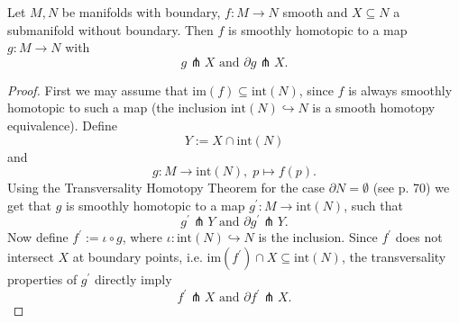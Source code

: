     \begin{theorem}
        \label{thm:transversality_homotopy}
        Let $M,N$ be manifolds with boundary, $f \colon M \to N$ smooth and $X \subseteq N$ a submanifold without boundary. Then $f$ is smoothly homotopic to a map $g \colon M \to N$ with
        \[
            g \pitchfork X \text{ and } \partial g \pitchfork X.
        \]
    \end{theorem}
    \begin{proof}
        First we may assume that $\mathrm{im}(f)\subseteq \mathrm{int}(N)$, since $f$ is always smoothly homotopic to such a map (the inclusion $\mathrm{int}(N) \hookrightarrow N$ is a smooth homotopy equivalence). Define
        \[
        Y := X \cap \mathrm{int}(N)
        \]
        and 
        \[
        g \colon M \to \mathrm{int}(N), \; p \mapsto f(p).
        \]
        Using the Transversality Homotopy Theorem for the case $\partial N = \emptyset$ (see \cite{guillemin2010differential} p. 70) we get that $g$ is smoothly homotopic to a map $g^\prime \colon M \to \mathrm{int}(N)$, such that 
        \[
            g^\prime \pitchfork Y \text{ and } \partial g^\prime \pitchfork Y.
        \]
        Now define $f^\prime := \iota \circ g$, where $\iota \colon \mathrm{int}(N) \hookrightarrow N$ is the inclusion. Since $f^\prime$ does not intersect $X$ at boundary points, i.e. $\mathrm{im}(f^\prime) \cap X \subseteq \mathrm{int}(N)$, the transversality properties of $g^\prime$ directly imply
        \[
            f^\prime \pitchfork X \text{ and } \partial f^\prime \pitchfork X.
        \]
        

\end{proof}
